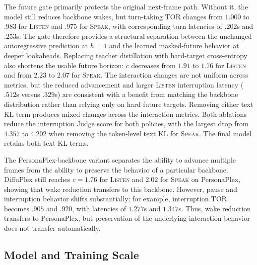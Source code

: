 

The future gate primarily protects the original next-frame path.
Without it, the model still reduces backbone wakes, but turn-taking TOR changes from $1.000$ to $.983$ for \textsc{Listen} and $.975$ for \textsc{Speak}, with corresponding turn latencies of $.202$s and $.253$s.
The gate therefore provides a structural separation between the unchanged autoregressive prediction at $h=1$ and the learned masked-future behavior at deeper lookaheads.
Replacing teacher distillation with hard-target cross-entropy also shortens the usable future horizon: $c$ decreases from $1.91$ to $1.76$ for \textsc{Listen} and from $2.23$ to $2.07$ for \textsc{Speak}.
The interaction changes are not uniform across metrics, but the reduced advancement and larger \textsc{Listen} interruption latency ($.512$s versus $.329$s) are consistent with a benefit from matching the backbone distribution rather than relying only on hard future targets.
Removing either text KL term produces mixed changes across the interaction metrics.
Both ablations reduce the interruption Judge score for both policies, with the largest drop from $4.357$ to $4.202$ when removing the token-level text KL for \textsc{Speak}.
The final model retains both text KL terms.

The PersonaPlex-backbone variant separates the ability to advance multiple frames from the ability to preserve the behavior of a particular backbone.
DiffuPlex still reaches $c=1.76$ for \textsc{Listen} and $2.02$ for \textsc{Speak} on PersonaPlex, showing that wake reduction transfers to this backbone.
However, pause and interruption behavior shifts substantially; for example, interruption TOR becomes $.905$ and $.920$, with latencies of $1.277$s and $1.347$s.
Thus, wake reduction transfers to PersonaPlex, but preservation of the underlying interaction behavior does not transfer automatically.

\subsection{Model and Training Scale}
\label{asubsec:training_scale}



